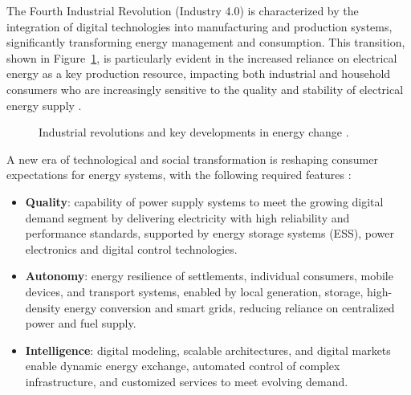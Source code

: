 
{\actuality} 
The Fourth Industrial Revolution (Industry 4.0) is characterized by the integration of digital technologies into manufacturing and production systems, significantly transforming energy management and consumption. This transition, shown in Figure~\cref{fig:industry4}, is particularly evident in the increased reliance on electrical energy as a key production resource, impacting both industrial and household consumers who are increasingly sensitive to the quality and stability of electrical energy supply \autocite{He_2022}.

\begin{figure}[ht]
    \caption{Industrial revolutions and key developments in energy change \cite{UNIDO2017}.}\label{fig:industry4}
\end{figure}

A new era of technological and social transformation is reshaping consumer expectations for energy systems, with the following required features \autocite{kholkin2025energy}:
\begin{itemize}
    \item  \textbf{Quality}: capability of power supply systems to meet the growing digital demand segment by delivering electricity with high reliability and performance standards, supported by energy storage systems (ESS), power electronics and digital control technologies.
    
    \item  \textbf{Autonomy}: energy resilience of settlements, individual consumers, mobile devices, and transport systems, enabled by local generation, storage, high-density energy conversion and smart grids, reducing reliance on centralized power and fuel supply.
    
    \item  \textbf{Intelligence}: digital modeling, scalable architectures, and digital markets enable dynamic energy exchange, automated control of complex infrastructure, and customized services to meet evolving demand.
\end{itemize}



